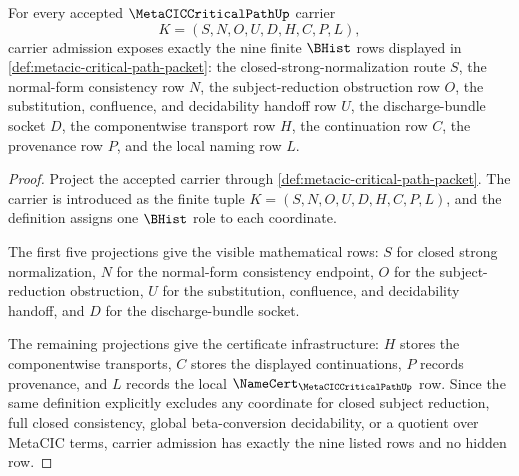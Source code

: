 \begin{theorem}
\label{thm:metacic-critical-path-carrier-admission}
For every accepted $\MetaCICCriticalPathUp$ carrier
$$
K=(S,N,O,U,D,H,C,P,L),
$$
carrier admission exposes exactly the nine finite $\BHist$ rows displayed in \autoref{def:metacic-critical-path-packet}: the closed-strong-normalization route $S$, the normal-form consistency row $N$, the subject-reduction obstruction row $O$, the substitution, confluence, and decidability handoff row $U$, the discharge-bundle socket $D$, the componentwise transport row $H$, the continuation row $C$, the provenance row $P$, and the local naming row $L$.
\end{theorem}
\begin{proof}
Project the accepted carrier through \autoref{def:metacic-critical-path-packet}. The carrier is introduced as the finite tuple $K=(S,N,O,U,D,H,C,P,L)$, and the definition assigns one $\BHist$ role to each coordinate.

The first five projections give the visible mathematical rows: $S$ for closed strong normalization, $N$ for the normal-form consistency endpoint, $O$ for the subject-reduction obstruction, $U$ for the substitution, confluence, and decidability handoff, and $D$ for the discharge-bundle socket.

The remaining projections give the certificate infrastructure: $H$ stores the componentwise transports, $C$ stores the displayed continuations, $P$ records provenance, and $L$ records the local $\NameCert_{\MetaCICCriticalPathUp}$ row. Since the same definition explicitly excludes any coordinate for closed subject reduction, full closed consistency, global beta-conversion decidability, or a quotient over MetaCIC terms, carrier admission has exactly the nine listed rows and no hidden row.
\end{proof}

